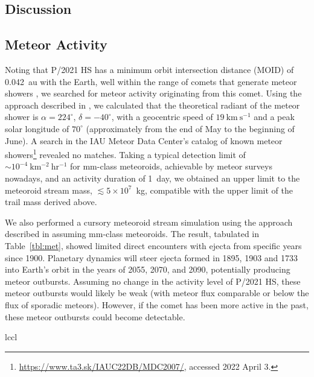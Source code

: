 \documentclass[modern]{aastex631}
\begin{document}
\begin{CJK*}{UTF8}{gbsn}
\section{Discussion}

\subsection{Meteor Activity}

Noting that P/2021 HS has a minimum orbit intersection distance (MOID) of 0.042~au with the Earth, well within the range of comets that generate meteor showers \citep[$\sim 0.1$~au,][]{Jenniskens2021}, we searched for meteor activity originating from this comet. Using the approach described in \citet{Neslusan1998}, we calculated that the theoretical radiant of the meteor shower is $\alpha=224^\circ$, $\delta=-40^\circ$, with a geocentric speed of $19~\mathrm{km~s^{-1}}$ and a peak solar longitude of $70^\circ$ (approximately from the end of May to the beginning of June). A search in the IAU Meteor Data Center's catalog of known meteor showers\footnote{\url{https://www.ta3.sk/IAUC22DB/MDC2007/}, accessed 2022 April 3.} revealed no matches. Taking a typical detection limit of $\sim 10^{-4}~\mathrm{km^{-2}~hr^{-1}}$ for mm-class meteoroids, achievable by meteor surveys nowadays, and an activity duration of 1~day, we obtained an upper limit to the meteoroid stream mass, $\lesssim5\times10^7$~kg, compatible with the upper limit of the trail mass derived above.

We also performed a cursory meteoroid stream simulation using the approach described in \citet{Ye2016} assuming mm-class meteoroids. The result, tabulated in Table~\ref{tbl:met}, showed limited direct encounters with ejecta from specific years since 1900. Planetary dynamics will steer ejecta formed in 1895, 1903 and 1733 into Earth's orbit in the years of 2055, 2070, and 2090, potentially producing meteor outbursts. Assuming no change in the activity level of P/2021 HS, these meteor outbursts would likely be weak (with meteor flux comparable or below the flux of sporadic meteors). However, if the comet has been more active in the past, these meteor outbursts could become detectable.

\begin{deluxetable*}{lccl}
\label{tbl:met}


\end{deluxetable*}
\end{CJK*}
\end{document}
